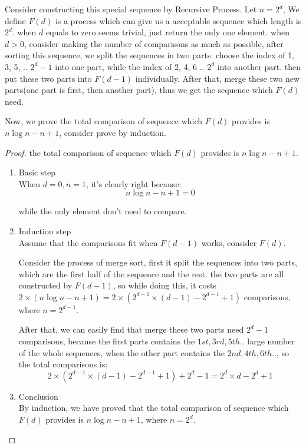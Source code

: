Consider constructing this special sequence by Recursive Process. Let $n = 2^d$, We define $F(d)$ is a process which can give us a acceptable sequence which length is $2^d$. when $d$ equals to zero seems trivial, just return the only one element. when $d > 0$, consider making the number of comparisons as much as possible, after sorting this sequence, we split the sequences in two parts. choose the index of 1, 3, 5, .. $2^d-1$ into one part, while the index of 2, 4, 6 .. $2^d$ into another part. then put these two parts into $F(d - 1)$ individually. After that, merge these two new parts(one part is first, then another part), thus we get the sequence which $F(d)$ need.

Now, we prove the total comparison of sequence which $F(d)$ provides is $n\log n - n + 1$, consider prove by induction.

\begin{proof}
the total comparison of sequence which $F(d)$ provides is $n\log n - n + 1$.
\begin{enumerate}
    \item Basic step\\
    When $d = 0, n = 1$, it's clearly right because:
	\[n\log n - n + 1 = 0\]

    while the only element don't need to compare.
    \item Induction step\\
    Assume that the comparisons fit when $F(d - 1)$ works, consider $F(d)$.

    Consider the process of merge sort, first it split the sequences into two parts, which are the first half of the sequence and the rest. the two parts are all constructed by $F(d - 1)$, so while doing this, it costs $2 \times (n \log n - n + 1) = 2 \times (2 ^{d-1} \times (d - 1) - 2^{d - 1} + 1)$ comparisons, where $n = 2^{d - 1}$.

    After that, we can easily find that merge these two parts need $2^{d} - 1$ comparisons, because the first parts contains the $1st, 3rd, 5th ..$ large number of the whole sequences, when the other part contains the $2nd, 4th, 6th .. $, so the total comparisons is:
    \[2 \times (2^{d - 1} \times (d - 1) - 2^{d - 1} + 1) + 2^{d} - 1 = 2^{d} \times d - 2^{d} + 1\]

    \item Conclusion\\
	By induction, we have proved that the total comparison of sequence which $F(d)$ provides is $n\log n - n + 1$, where $n = 2^{d}$.
\end{enumerate}
\end{proof}
